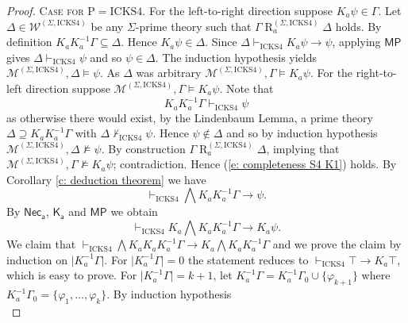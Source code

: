 \documentclass[10pt,a4paper]{amsart}
\newcommand{\K}{K}
\newcommand{\Rel}{\mathrel{R}}
\newcommand{\W}{\mathcal{W}}
\newcommand{\agi}{a}
\newcommand{\fw}{\mathcal{M}}
\newcommand{\hickp}{\mathrm{P}}
\newcommand{\hicks}{\mathrm{ICKS4}}
\begin{document}
\begin{proof}
     \noindent \textsc{Case for $\hickp = \hicks$.} For the left-to-right direction suppose $\K_\agi \psi \in \Gamma$. Let $\Delta \in \W^{(\Sigma, \hicks)}$ be any $\Sigma$-prime theory such that $\Gamma \Rel_\agi^{(\Sigma, \hicks)} \Delta$ holds. By definition $\K_\agi \K_\agi^{-1} \Gamma \subseteq \Delta$. Hence $\K_\agi \psi \in \Delta$. Since $\Delta \vdash_\hicks \K_\agi \psi \rightarrow \psi$, applying $\mathsf{MP}$ gives $\Delta \vdash_\hicks \psi$ and so $\psi \in \Delta$. The induction hypothesis yields $\fw^{(\Sigma, \hicks)}, \Delta \models \psi$. As $\Delta$ was arbitrary $\fw^{(\Sigma, \hicks)}, \Gamma \models \K_\agi \psi$. For the right-to-left direction suppose $\fw^{(\Sigma, \hicks)}, \Gamma \models \K_\agi \psi$. Note that
    \begin{equation}\label{e: completeness S4 K1}
       \K_\agi \K_\agi^{-1} \Gamma \vdash_\hicks \psi
    \end{equation}
    as otherwise there would exist, by the Lindenbaum Lemma, a prime theory $\Delta \supseteq \K_\agi \K_\agi^{-1} \Gamma$ with $\Delta \not \vdash_\hicks \psi$. Hence $\psi \not \in \Delta$ and so by induction hypothesis $\fw^{(\Sigma, \hicks)}, \Delta \not \models \psi$. By construction $\Gamma \Rel_\agi^{(\Sigma, \hicks)} \Delta$, implying that $\fw^{(\Sigma, \hicks)}, \Gamma \not \models \K_\agi \psi$; contradiction. Hence (\ref{e: completeness S4 K1}) holds. By Corollary \ref{c: deduction theorem} we have
    \begin{equation}\label{e: completeness S4 K2}
        \vdash_\hicks \bigwedge \K_\agi \K_\agi^{-1} \Gamma \rightarrow \psi.
    \end{equation}
    By $\mathsf{Nec_\agi}$, $\mathsf{K_\agi}$ and $\mathsf{MP}$ we obtain
    \begin{equation}\label{e: completeness S4 K3}
        \vdash_\hicks \K_\agi \bigwedge \K_\agi \K_\agi^{-1} \Gamma \rightarrow \K_\agi \psi.
    \end{equation}
   We claim that $\vdash_\hicks \bigwedge \K_\agi \K_\agi \K_\agi^{-1} \Gamma \rightarrow \K_\agi \bigwedge \K_\agi \K_\agi^{-1} \Gamma$ and we prove the claim by induction on $\lvert \K_\agi^{-1} \Gamma \rvert$. For ${\lvert \K_\agi^{-1} \Gamma \rvert = 0}$ the statement reduces to $\vdash_\hicks  \top \rightarrow \K_\agi \top$, which is easy to prove. For ${\lvert \K_\agi^{-1} \Gamma \rvert = k+1}$, let $\K_\agi^{-1} \Gamma = \K_\agi^{-1}\Gamma_0 \cup \{\varphi_{k+1}\}$ where $ \K_\agi^{-1} \Gamma_0= \{\varphi_1, \ldots,\varphi_k\}$. By induction hypothesis
   \begin{equation}\label{e: completeness S4 K4}

\end{equation}
\end{proof}
\end{document}
